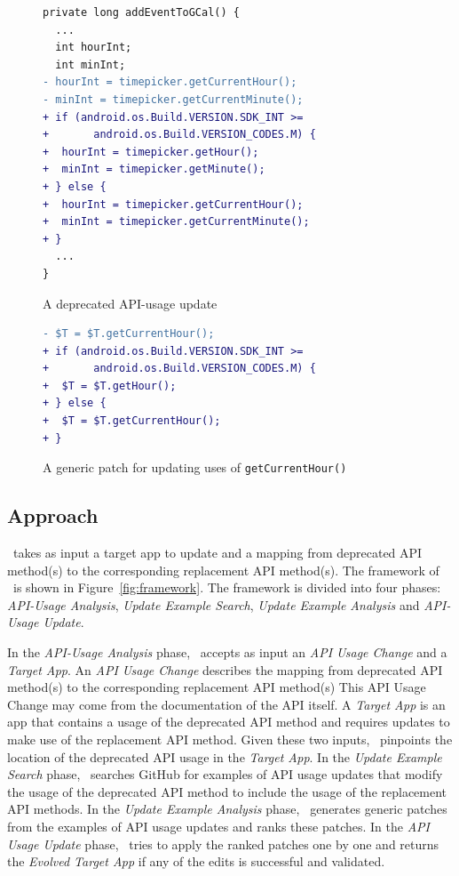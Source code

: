 \begin{figure}[htb]
\centering
\begin{lstlisting}[language=diff,numbers=none]
private long addEventToGCal() {
  ...
  int hourInt;
  int minInt;
- hourInt = timepicker.getCurrentHour();
- minInt = timepicker.getCurrentMinute();
+ if (android.os.Build.VERSION.SDK_INT >= 
+       android.os.Build.VERSION_CODES.M) {
+  hourInt = timepicker.getHour();
+  minInt = timepicker.getMinute();
+ } else {
+  hourInt = timepicker.getCurrentHour();
+  minInt = timepicker.getCurrentMinute();
+ }
  ...
}
\end{lstlisting}
\caption{A deprecated API-usage update}
\label{fig:deprecated_api_update_example}
\end{figure}

\begin{figure}[htb]
\centering
\begin{lstlisting}[language=diff,numbers=none]
- $T = $T.getCurrentHour();
+ if (android.os.Build.VERSION.SDK_INT >= 
+       android.os.Build.VERSION_CODES.M) {
+  $T = $T.getHour();
+ } else {
+  $T = $T.getCurrentHour();
+ }
\end{lstlisting}
\caption{A generic patch for updating uses of \texttt{getCurrentHour()}}
\label{fig:deprecated_api_update_edits}
\end{figure}

\subsection{Approach}
\toolname\ takes as input a target app to update and a mapping from 
deprecated API method(s)  to the corresponding replacement API method(s). The
framework of \toolname\ is shown in Figure~\ref{fig:framework}. The
framework is divided into four phases: {\em API-Usage Analysis}, {\em
  Update Example Search}, {\em Update Example Analysis} and {\em API-Usage
  Update}.

In the {\em API-Usage Analysis} phase, \toolname\ accepts as input an {\em
  API Usage Change} and a {\em Target App}. An {\em API Usage Change}
describes the mapping from deprecated API method(s) to the corresponding
replacement API method(s)  This API Usage Change may come from the documentation of the API itself. A {\em Target App} is an app
that contains a usage of the deprecated API method and requires updates to
make use of the replacement API method. Given these two inputs,
\toolname\ pinpoints the location of the deprecated API usage in the {\em
  Target App}. In the {\em Update Example Search} phase,
\toolname\ searches GitHub for examples of API usage updates that modify
the usage of the deprecated API method to include the usage of the
replacement API methods. In the {\em Update Example Analysis} phase,
\toolname\ generates generic patches from the examples of API usage updates and ranks these patches. In
the {\em API Usage Update} phase, \toolname\ tries to apply the ranked
patches one by one and returns the {\em Evolved Target App} if any of the
edits is successful and validated.

